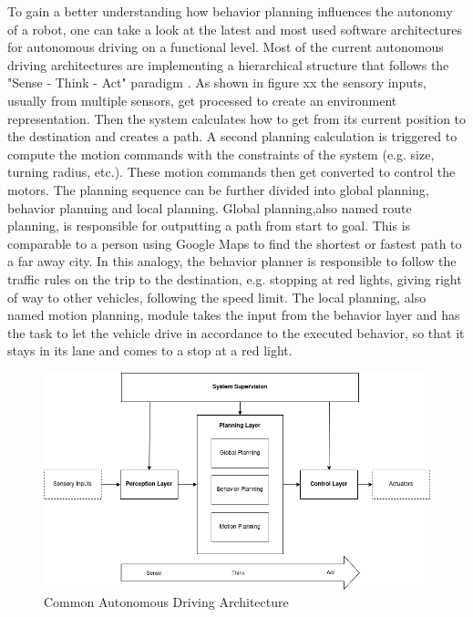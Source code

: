 To gain a better understanding how behavior planning influences the autonomy of a robot, one can take a look at the latest and most used software architectures for autonomous driving on a functional level. 
Most of the current autonomous driving architectures are implementing a hierarchical structure that follows the "Sense - Think - Act" paradigm \cite{murphy2000}. As shown in figure xx the sensory inputs, usually from multiple sensors, get processed to create an environment representation. Then the system calculates how to get from its current position to the destination and creates a path. A second planning calculation is triggered to compute the motion commands with the constraints of the system (e.g. size, turning radius, etc.). These motion commands then get converted to control the motors. 
The planning sequence can be further divided into global planning, behavior planning and local planning. Global planning,also named route planning, is responsible for outputting a path from start to goal. This is comparable to a person using Google Maps to find the shortest or fastest path to a far away city. In this analogy, the behavior planner is responsible to follow the traffic rules on the trip to the destination, e.g. stopping at red lights, giving right of way to other vehicles, following the speed limit. The local planning, also named motion planning, module takes the input from the behavior layer and has the task to let the vehicle drive in accordance to the executed behavior, so that it stays in its lane and comes to a stop at a red light. \\
\begin{figure}
	\includegraphics[width=1.0\textwidth]{images/autonomous_driving_architecture.png}
	\caption{Common Autonomous Driving Architecture \cite{1087032} \cite{9266268}  }
\end{figure}
 \\

